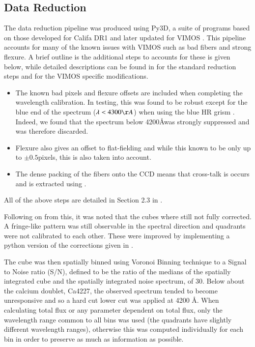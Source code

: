 \documentclass[a4paper,fleqn,usenatbib,useAMS]{mnras}
\begin{document}
	\subsection{Data Reduction}
		\label{subsec:reduct}
		The data reduction pipeline was produced using Py3D, a suite of programs based on those developed for Califa DR1 \citep{Sanchez2011, Husemann2013} and later updated for VIMOS \citep{Husemann2014}. This pipeline accounts for many of the known issues with VIMOS such as bad fibers and strong flexure. A brief outline is the additional steps to accounts for these is given below, while detailed descriptions can be found in \citet{Sanchez2011} for the standard reduction steps and \citep{Husemann2014} for the VIMOS specific modifications. 
		\begin{itemize}
		\item The known bad pixels and flexure offsets are included when completing the wavelength calibration. In testing, this was found to be robust except for the blue end of the spectrum ($\lambda < 4300 \AA$) when using the blue HR grism \citep{Husemann2014}. Indeed, we found that the spectrum below 4200\AA was strongly suppressed and was therefore discarded.
		\item Flexure also gives an offset to flat-fielding and while this known to be only up to $\pm0.5$pixels, this is also taken into account.
		\item The dense packing of the fibers onto the CCD means that cross-talk is occurs and is extracted using \citep{Horne1986}. 
		\end{itemize}
		All of the above steps are detailed in Section 2.3 in \citet{Husemann2014}.


		Following on from this, it was noted that the cubes where still not fully corrected. A fringe-like pattern was still observable in the spectral direction and quadrants were not calibrated to each other. These were improved by implementing a python version of the corrections given in \citet{Lagerhom2012}. 


		The cube was then spatially binned using Voronoi Binning technique \citep{Cappellari2003} to a Signal to Noise ratio (S/N), defined to be the ratio of the medians of the spatially integrated cube and the spatially integrated noise spectrum, of 30. Below about the calcium doublet, Ca4227, the observed spectrum tended to become unresponsive and so a hard cut lower cut was applied at 4200 \AA. When calculating total flux or any parameter dependent on total flux, only the wavelength range common to all bins was used (the quadrants have slightly different wavelength ranges), otherwise this was computed individually for each bin in order to preserve as much as information as possible.
\end{document}
